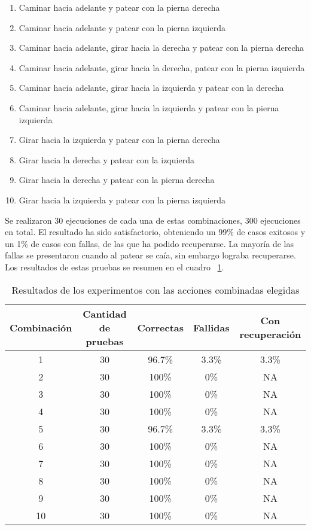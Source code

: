 \begin{enumerate}
\setlength{\itemsep}{0.5pt}
\item Caminar hacia adelante y patear con la pierna derecha 
\item Caminar hacia adelante y patear con la pierna izquierda
\item Caminar hacia adelante, girar hacia la derecha y patear con la pierna derecha
\item Caminar hacia adelante, girar hacia la derecha, patear con la pierna izquierda 
\item Caminar hacia adelante, girar hacia la izquierda y patear con la derecha
\item Caminar hacia adelante, girar hacia la  izquierda y  patear con la pierna izquierda
\item Girar hacia la izquierda y patear con la pierna derecha
\item Girar hacia la derecha y patear con la izquierda
\item Girar hacia la derecha y patear con la pierna derecha
\item Girar hacia la izquierda y patear con la pierna izquierda

\end{enumerate}
Se realizaron 30 ejecuciones de cada una de estas combinaciones, 300 ejecuciones en total. El resultado ha sido satisfactorio, obteniendo un 99\% de casos exitosos y un 1\% de casos con fallas, de las que ha podido recuperarse. La mayoría de las fallas se presentaron cuando al patear se caía, sin embargo lograba recuperarse. Los resultados de estas pruebas se resumen en el cuadro ~\ref{fig:combinadas}.
 
\begin{table}
\centering
\begin{tabular}{|c|c|c|c|c|}
\hline 
Combinaci\'on & Cantidad de pruebas & Correctas & Fallidas & Con recuperaci\'on \\ 
\hline 
1 & 30 & 96.7\% & 3.3\% & 3.3\% \\ 
\hline 
2 & 30 & 100\% & 0\% & NA \\ 
\hline 
3 & 30 & 100\% & 0\% & NA \\ 
\hline 
4 & 30 & 100\% & 0\% & NA \\ 
\hline 
5 & 30 & 96.7\% & 3.3\% & 3.3\% \\ 
\hline 
6 & 30 & 100\% & 0\% & NA \\ 
\hline 
7 & 30 & 100\% & 0\% & NA \\ 
\hline 
8 & 30 & 100\% & 0\% & NA \\ 
\hline 
9 & 30 & 100\% & 0\% & NA \\ 
\hline 
10 & 30 & 100\% & 0\% & NA \\ 
\hline 
\end{tabular} 
\caption{Resultados de los experimentos con las acciones combinadas elegidas}
\label{fig:combinadas}
\end{table}

